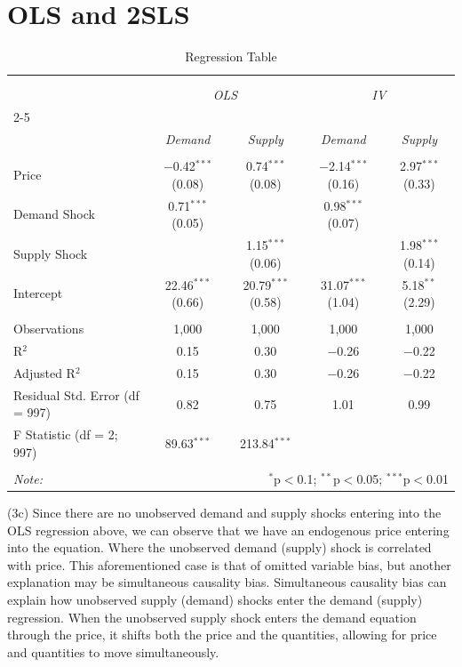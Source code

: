 \documentclass[12pt]{article}
\begin{document}
\section{OLS and 2SLS}
\begin{table}[!htbp] \centering 
  \caption{Regression Table} 
  \label{} 
\small 
\begin{tabular}{@{\extracolsep{5pt}}lcccc} 
\\[-1.8ex]\hline 
\hline \\[-1.8ex] 
\\[-1.8ex] 
& \multicolumn{2}{c}{\textit{OLS}} 
& \multicolumn{2}{c}{\textit{IV}} \\ 
\cline{2-5} \\[-1ex]
& \textit{Demand} & \textit{Supply} 
& \textit{Demand} & \textit{Supply} \\ 
\hline \\[-1.8ex]
 Price & $-$0.42$^{***}$ (0.08) & 0.74$^{***}$ (0.08) & $-$2.14$^{***}$ (0.16) & 2.97$^{***}$ (0.33) \\ 
  Demand Shock & 0.71$^{***}$ (0.05) &  & 0.98$^{***}$ (0.07) &  \\ 
  Supply Shock &  & 1.15$^{***}$ (0.06) &  & 1.98$^{***}$ (0.14) \\ 
  Intercept & 22.46$^{***}$ (0.66) & 20.79$^{***}$ (0.58) & 31.07$^{***}$ (1.04) & 5.18$^{**}$ (2.29) \\ 
 \hline \\[-1.8ex] 
Observations & 1,000 & 1,000 & 1,000 & 1,000 \\ 
R$^{2}$ & 0.15 & 0.30 & $-$0.26 & $-$0.22 \\ 
Adjusted R$^{2}$ & 0.15 & 0.30 & $-$0.26 & $-$0.22 \\ 
Residual Std. Error (df = 997) & 0.82 & 0.75 & 1.01 & 0.99 \\ 
F Statistic (df = 2; 997) & 89.63$^{***}$ & 213.84$^{***}$ &  &  \\ 
\hline 
\hline \\[-1.8ex] 
\textit{Note:}  & \multicolumn{4}{r}{$^{*}$p$<$0.1; $^{**}$p$<$0.05; $^{***}$p$<$0.01} \\ 
\end{tabular} 
\end{table} 

(3c) Since there are no unobserved demand and supply shocks entering into the OLS regression above, we can observe that we have an endogenous price entering into the equation. Where the unobserved demand (supply) shock is correlated with price. This aforementioned case is that of omitted variable bias, but another explanation may be simultaneous causality bias. Simultaneous causality bias can explain how unobserved supply (demand) shocks enter the demand (supply) regression. When the unobserved supply shock enters the demand equation through the price, it shifts both the price and the quantities, allowing for price and quantities to move simultaneously.
\end{document}
